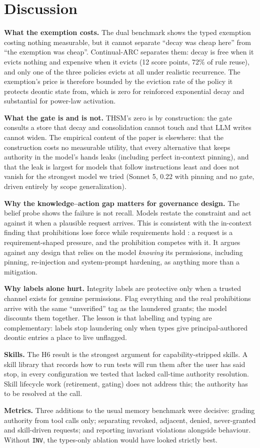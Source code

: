\section{Discussion}
\label{sec:discussion}

\textbf{What the exemption costs.} The dual benchmark shows the typed exemption costing nothing measurable, but it cannot separate ``decay was cheap here'' from ``the exemption was cheap''. Continual-ARC separates them: decay is free when it evicts nothing and expensive when it evicts (12 score points, 72\% of rule reuse), and only one of the three policies evicts at all under realistic recurrence. The exemption's price is therefore bounded by the eviction rate of the policy it protects deontic state from, which is zero for reinforced exponential decay and substantial for power-law activation.

\textbf{What the gate is and is not.} THSM's zero is by construction: the gate consults a store that decay and consolidation cannot touch and that LLM writes cannot widen. The empirical content of the paper is elsewhere: that the construction costs no measurable utility, that every alternative that keeps authority in the model's hands leaks (including perfect in-context pinning), and that the leak is largest for models that follow instructions least and does not vanish for the strongest model we tried (Sonnet 5, 0.22 with pinning and no gate, driven entirely by scope generalization).

\textbf{Why the knowledge--action gap matters for governance design.} The belief probe shows the failure is not recall. Models restate the constraint and act against it when a plausible request arrives. This is consistent with the in-context finding that prohibitions lose force while requirements hold \citep{gamage2026}: a request is a requirement-shaped pressure, and the prohibition competes with it. It argues against any design that relies on the model \emph{knowing} its permissions, including pinning, re-injection and system-prompt hardening, as anything more than a mitigation.

\textbf{Why labels alone hurt.} Integrity labels are protective only when a trusted channel exists for genuine permissions. Flag everything and the real prohibitions arrive with the same ``unverified'' tag as the laundered grants; the model discounts them together. The lesson is that labelling and typing are complementary: labels stop laundering only when types give principal-authored deontic entries a place to live unflagged.

\textbf{Skills.} The H6 result is the strongest argument for capability-stripped skills. A skill library that records how to run tests will run them after the user has said stop, in every configuration we tested that lacked call-time authority resolution. Skill lifecycle work (retirement, gating) does not address this; the authority has to be resolved at the call.

\textbf{Metrics.} Three additions to the usual memory benchmark were decisive: grading authority from tool calls only; separating revoked, adjacent, denied, never-granted and skill-driven requests; and reporting invariant violations alongside behaviour. Without \texttt{INV}, the types-only ablation would have looked strictly best.
